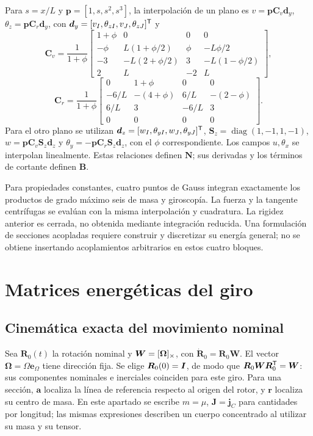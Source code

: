 Para $s=x/L$ y $\bm p=[1,s,s^2,s^3]$, la interpolación de un plano es $v=\bm p\bm C_v\bm d_y$, $\theta_z=\bm p\bm C_r\bm d_y$, con $\bm d_y=[v_I,\theta_{zI},v_J,\theta_{zJ}]^\mathsf T$ y
\begin{equation}
\bm C_v=\frac1{1+\phi}\begin{bmatrix}
1+\phi&0&0&0\\
-\phi&L(1+\phi/2)&\phi&-L\phi/2\\
-3&-L(2+\phi/2)&3&-L(1-\phi/2)\\
2&L&-2&L
\end{bmatrix},
\end{equation}
\begin{equation}
\bm C_r=\frac1{1+\phi}\begin{bmatrix}
0&1+\phi&0&0\\
-6/L&-(4+\phi)&6/L&-(2-\phi)\\
6/L&3&-6/L&3\\0&0&0&0
\end{bmatrix}.
\end{equation}
Para el otro plano se utilizan $\bm d_z=[w_I,\theta_{yI},w_J,\theta_{yJ}]^\mathsf T$, $\bm S_z=\operatorname{diag}(1,-1,1,-1)$, $w=\bm p\bm C_v\bm S_z\bm d_z$ y $\theta_y=-\bm p\bm C_r\bm S_z\bm d_z$, con el $\phi$ correspondiente. Los campos $u,\theta_x$ se interpolan linealmente. Estas relaciones definen $\bm N$; sus derivadas y los términos de cortante definen $\bm B$.

Para propiedades constantes, cuatro puntos de Gauss integran exactamente los productos de grado máximo seis de masa y giroscopía. La fuerza y la tangente centrífugas se evalúan con la misma interpolación y cuadratura. La rigidez anterior es cerrada, no obtenida mediante integración reducida. Una formulación de secciones acopladas requiere construir y discretizar su energía general; no se obtiene insertando acoplamientos arbitrarios en estos cuatro bloques.


\section{Matrices energéticas del giro}\label{ap:gyro}

\subsection{Cinemática exacta del movimiento nominal}
Sea $\bm R_0(t)$ la rotación nominal y $\bm W=[\bm{\Omega}]_\times$, con $\dot{\bm R}_0=\bm R_0\bm W$. El vector $\bm\Omega=\Omega\bm e_\Omega$ tiene dirección fija. Se elige $\bm R_0(0)=\bm I$, de modo que $\bm R_0\bm W\bm R_0^\mathsf T=\bm W$: sus componentes nominales e inerciales coinciden para este giro. Para una sección, $\bm a$ localiza la línea de referencia respecto al origen del rotor, y $\bm r$ localiza su centro de masa. En este apartado se escribe $m=\mu$, $\bm J=\bm j_C$ para cantidades por longitud; las mismas expresiones describen un cuerpo concentrado al utilizar su masa y su tensor.

